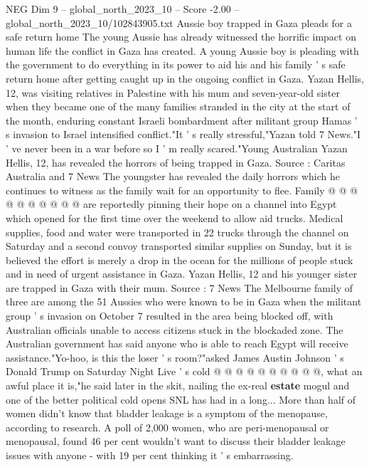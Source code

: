 \begin{textsample}{NEG Dim 9 – global\_north\_2023\_10 – Score -2.00 – global\_north\_2023\_10/102843905.txt}  \label{ex:f9_neg_154}
Aussie boy trapped in Gaza pleads for a safe return home The young Aussie has already witnessed the horrific impact on human life the conflict in Gaza has created.
A young Aussie boy is pleading with the government to do everything in its power to aid his and his family ' s safe return home after getting caught up in the ongoing conflict in Gaza.
Yazan Hellis, 12, was visiting relatives in Palestine with his mum and seven-year-old sister when they became one of the many families stranded in the city at the start of the month, enduring constant Israeli bombardment after militant group Hamas ' s invasion to Israel intensified conflict."It ' s really stressful,"Yazan told 7 News."I ' ve never been in a war before so I ' m really scared."Young Australian Yazan Hellis, 12, has revealed the horrors of being trapped in Gaza.
Source : Caritas Australia and 7 News The youngster has revealed the daily horrors which he continues to witness as the family wait for an opportunity to flee.
Family @ @ @ @ @ @ @ @ @ @ are reportedly pinning their hope on a channel into Egypt which opened for the first time over the weekend to allow aid trucks.
Medical supplies, food and water were transported in 22 trucks through the channel on Saturday and a second convoy transported similar supplies on Sunday, but it is believed the effort is merely a drop in the ocean for the millions of people stuck and in need of urgent assistance in Gaza.
Yazan Hellis, 12 and his younger sister are trapped in Gaza with their mum.
Source : 7 News The Melbourne family of three are among the 51 Aussies who were known to be in Gaza when the militant group ' s invasion on October 7 resulted in the area being blocked off, with Australian officials unable to access citizens stuck in the blockaded zone.
The Australian government has said anyone who is able to reach Egypt will receive assistance."Yo-hoo, is this the loser ' s room?"asked James Austin Johnson ' s Donald Trump on Saturday Night Live ' s cold @ @ @ @ @ @ @ @ @ @, what an awful place it is,"he said later in the skit, nailing the ex-real \textbf{estate} mogul and one of the better political cold opens SNL has had in a long...
More than half of women didn't know that bladder leakage is a symptom of the menopause, according to research.
A poll of 2,000 women, who are peri-menopausal or menopausal, found 46 per cent wouldn't want to discuss their bladder leakage issues with anyone - with 19 per cent thinking it ' s embarrassing.

\end{textsample}
